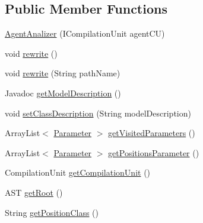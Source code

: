 \subsection*{Public Member Functions}
\begin{DoxyCompactItemize}
\item 
\hyperlink{classit_1_1isislab_1_1masonassisteddocumentation_1_1mason_1_1analizer_1_1_agent_analizer_a73ca1a318ae1635984ceced89e3f8d1d}{Agent\-Analizer} (I\-Compilation\-Unit agent\-C\-U)
\item 
void \hyperlink{classit_1_1isislab_1_1masonassisteddocumentation_1_1mason_1_1analizer_1_1_agent_analizer_aa1cf97eff47c73e305fdd540a512a88c}{rewrite} ()
\item 
void \hyperlink{classit_1_1isislab_1_1masonassisteddocumentation_1_1mason_1_1analizer_1_1_agent_analizer_afd9a63275f03a03ca69187b8cce6613e}{rewrite} (String path\-Name)
\item 
Javadoc \hyperlink{classit_1_1isislab_1_1masonassisteddocumentation_1_1mason_1_1analizer_1_1_agent_analizer_ae8de4d1c4186a27f567257c4b85c3f1c}{get\-Model\-Description} ()
\item 
void \hyperlink{classit_1_1isislab_1_1masonassisteddocumentation_1_1mason_1_1analizer_1_1_agent_analizer_aaef67e385b42699bd863f505be5df17d}{set\-Class\-Description} (String model\-Description)
\item 
Array\-List$<$ \hyperlink{classit_1_1isislab_1_1masonassisteddocumentation_1_1mason_1_1analizer_1_1_parameter}{Parameter} $>$ \hyperlink{classit_1_1isislab_1_1masonassisteddocumentation_1_1mason_1_1analizer_1_1_agent_analizer_a76b619307dd702b85fc422f231fac76a}{get\-Visited\-Parameters} ()
\item 
Array\-List$<$ \hyperlink{classit_1_1isislab_1_1masonassisteddocumentation_1_1mason_1_1analizer_1_1_parameter}{Parameter} $>$ \hyperlink{classit_1_1isislab_1_1masonassisteddocumentation_1_1mason_1_1analizer_1_1_agent_analizer_a351c38491d7f706177c4c76478cabd6d}{get\-Positions\-Parameter} ()
\item 
Compilation\-Unit \hyperlink{classit_1_1isislab_1_1masonassisteddocumentation_1_1mason_1_1analizer_1_1_agent_analizer_a452c584a7035bc8c4a550f4e86db8266}{get\-Compilation\-Unit} ()
\item 
A\-S\-T \hyperlink{classit_1_1isislab_1_1masonassisteddocumentation_1_1mason_1_1analizer_1_1_agent_analizer_a1ac3fc1c6fdf3133e81fba94fe13c01d}{get\-Root} ()
\item 
String \hyperlink{classit_1_1isislab_1_1masonassisteddocumentation_1_1mason_1_1analizer_1_1_agent_analizer_a3e46e6754b6575579be1a9ac062641fa}{get\-Position\-Class} ()

\end{DoxyCompactItemize}
